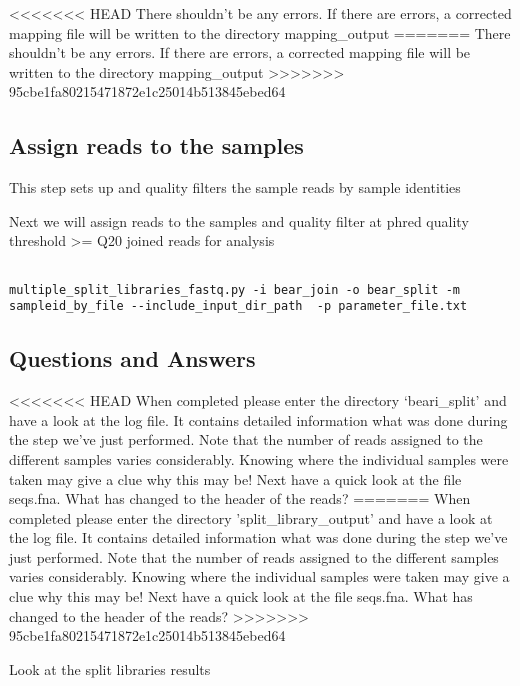 \begin{note}
<<<<<<< HEAD
There shouldn’t be any errors. If there are errors, a corrected mapping file will be written to the directory mapping\_output
=======
There shouldn't be any errors. If there are errors, a corrected mapping file will be written to the directory mapping\_output
>>>>>>> 95cbe1fa80215471872e1c25014b513845ebed64
\end{note}

\subsection{Assign reads to the samples}

\begin{information}
This step sets up and quality filters the sample reads by sample identities
\end{information}

\begin{steps}
Next we will assign reads to the samples and quality filter at phred quality threshold >= Q20 joined reads for analysis
\begin{lstlisting}

multiple_split_libraries_fastq.py -i bear_join -o bear_split -m sampleid_by_file --include_input_dir_path  -p parameter_file.txt

\end{lstlisting}

\end{steps}

\subsection{Questions and Answers}

\begin{questions}
<<<<<<< HEAD
When completed please enter the directory ‘beari\_split’ and have a look at the log file. It contains detailed information what was done during the step we’ve just performed. Note that the number of reads assigned to the different samples varies considerably. Knowing where the individual samples were taken may give a clue why this may be! Next have a quick look at the file seqs.fna. What has changed to the header of the reads?
=======
When completed please enter the directory 'split\_library\_output' and have a look at the log file. It contains detailed information what was done during the step we've just performed. Note that the number of reads assigned to the different samples varies considerably. Knowing where the individual samples were taken may give a clue why this may be! Next have a quick look at the file seqs.fna. What has changed to the header of the reads?
>>>>>>> 95cbe1fa80215471872e1c25014b513845ebed64

\begin{answer}
Look at the split libraries results
\end{answer}

\end{questions}

